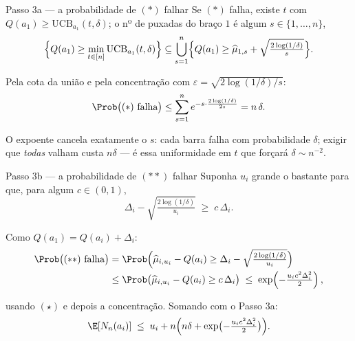 \documentclass[aspectratio=169, 11pt]{beamer}
\newcommand{\muh}{\widehat{\mu}}
\newcommand{\ucb}{\mathrm{UCB}}
\begin{document}
\begin{frame}{Passo 3a --- a probabilidade de $(*)$ falhar}
  Se $(*)$ falha, existe $t$ com $Q(a_1)\ge \ucb_{a_1}(t,\delta)$; o nº de
  puxadas do braço $1$ é algum $s\in\{1,\dots,n\}$,
  \vspace{-0.3em}
  \[
    \Bigl\{Q(a_1)\ge \min_{t\in[n]}\ucb_{a_1}(t,\delta)\Bigr\}
    \subseteq \bigcup_{s=1}^{n}
      \Bigl\{Q(a_1)\ge \muh_{1,s}+\sqrt{\tfrac{2\log(1/\delta)}{s}}\Bigr\}.
  \]
  \vspace{-0.7em}

  Pela cota da união e pela concentração com
  $\varepsilon=\sqrt{2\log(1/\delta)/s}$:
  \vspace{-0.3em}
  \[
    \Prob\bigl((*)\text{ falha}\bigr)
      \le \sum_{s=1}^{n} e^{-s\cdot\frac{2\log(1/\delta)}{2s}} = n\,\delta .
  \]

  \begin{ideiabox}
    O expoente cancela exatamente o $s$: cada barra falha com probabilidade
    $\delta$; exigir que \emph{todas} valham custa $n\delta$ --- é essa
    uniformidade em $t$ que forçará $\delta \sim n^{-2}$.
  \end{ideiabox}
\end{frame}

\begin{frame}{Passo 3b --- a probabilidade de $(**)$ falhar}
  Suponha $u_i$ grande o bastante para que, para algum $c\in(0,1)$,
  \vspace{-0.2em}
  \begin{equation}
    \Delta_i - \sqrt{\tfrac{2\log(1/\delta)}{u_i}} \;\ge\; c\,\Delta_i .
    \tag{$\star$}
  \end{equation}
  \vspace{-1.1em}

  Como $Q(a_1)=Q(a_i)+\Delta_i$:
  \vspace{-0.3em}
  \begin{align*}
    \Prob\bigl((**)\text{ falha}\bigr)
      &= \Prob\Bigl(\muh_{i,u_i}-Q(a_i) \ge \Delta_i - \sqrt{\tfrac{2\log(1/\delta)}{u_i}}\Bigr)\\[-0.1em]
      &\le \Prob\bigl(\muh_{i,u_i}-Q(a_i)\ge c\,\Delta_i\bigr)
        \;\le\; \exp\!\left(-\tfrac{u_i c^{2}\Delta_i^{2}}{2}\right),
  \end{align*}
  \vspace{-0.6em}

  usando $(\star)$ e depois a concentração. Somando com o Passo 3a:
  \vspace{-0.3em}
  \[
    \E[N_n(a_i)] \;\le\; u_i + n\Bigl(n\delta + \exp\bigl(-\tfrac{u_i c^{2}\Delta_i^{2}}{2}\bigr)\Bigr).
  \]
\end{frame}
\end{document}
